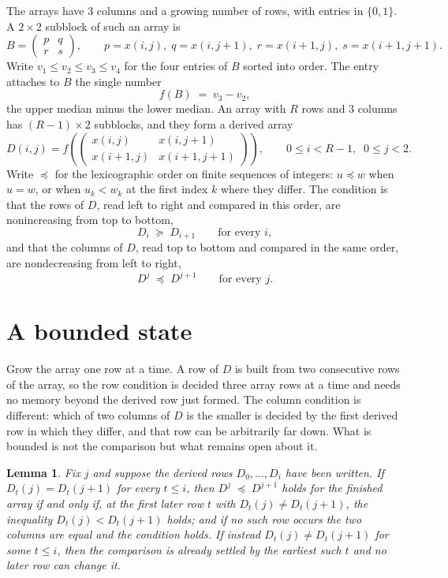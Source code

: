 \documentclass[11pt,a4paper]{article}
\theoremstyle{plain}
\newtheorem{lemma}[theorem]{Lemma}
\theoremstyle{definition}
\begin{document}
The arrays have $3$ columns and a growing number of rows, with entries in $\{0,1\}$. A
$2\times2$ subblock of such an array is
\[
B=\begin{pmatrix} p & q \\ r & s \end{pmatrix},
\qquad p=x(i,j),\; q=x(i,j+1),\; r=x(i+1,j),\; s=x(i+1,j+1).
\]
Write $v_1\le v_2\le v_3\le v_4$ for the four entries of $B$ sorted into order. The entry attaches to $B$ the single number
\[
f(B)\;=\;v_3-v_2,
\]
the upper median minus the lower median. An array with $R$ rows and $3$ columns has $(R-1)\times2$ subblocks, and they
form a derived array
\[
D(i,j)=f\!\left(\begin{pmatrix} x(i,j) & x(i,j+1) \\ x(i+1,j) & x(i+1,j+1)\end{pmatrix}
\right),\qquad 0\le i<R-1,\;\; 0\le j<2 .
\]
Write $\preceq$ for the lexicographic order on finite sequences of integers: $u\preceq w$ when
$u=w$, or when $u_k<w_k$ at the first index $k$ where they differ. The condition is that the
rows of $D$, read left to right and compared in this order, are nonincreasing from top to bottom,
\[
D_{i}\;\succeq\;D_{i+1}\qquad\text{for every } i,
\]
and that the columns of $D$, read top to bottom and compared in the same order, are nondecreasing
from left to right,
\[
D^{j}\;\preceq\;D^{j+1}\qquad\text{for every } j .
\]

\section{A bounded state}

Grow the array one row at a time. A row of $D$ is built from two consecutive rows of the array,
so the row condition is decided three array rows at a time and needs no memory beyond the
derived row just formed. The column condition is different: which of two columns of $D$ is the
smaller is decided by the first derived row in which they differ, and that row can be
arbitrarily far down. What is bounded is not the comparison but what remains open about it.

\begin{lemma}\label{lem:bits}
Fix $j$ and suppose the derived rows $D_0,\dots,D_i$ have been written. If $D_t(j)=D_t(j+1)$ for
every $t\le i$, then $D^{j}\;\preceq\;D^{j+1}$ holds for the finished array if and only if,
at the first later row $t$ with $D_t(j)\neq D_t(j+1)$, the inequality $D_t(j)<D_t(j+1)$
holds; and if no such row occurs the two columns are equal and the condition holds. If instead
$D_t(j)\neq D_t(j+1)$ for some $t\le i$, then the comparison is already settled by the earliest
such $t$ and no later row can change it.
\end{lemma}
\end{document}
